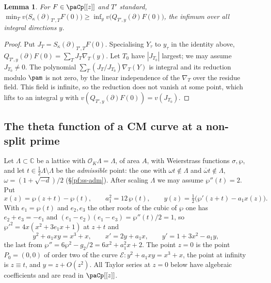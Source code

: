 \documentclass[10pt]{amsart}
\newtheorem{lemma}[theorem]{Lemma}
\theoremstyle{definition}
\theoremstyle{remark}
\newcommand{\C}{\mathbb C}
\providecommand{\auO}{\mathcal O}
\providecommand{\aubar}[1]{\overline{#1}}
\begin{document}
\begin{lemma}\label{pa:schur}
For $F\in\paCp[[z]]$ and $T'$ standard,
$\min_Tv\bigl(S_\kappa(\partial)_{T',T}F(0)\bigr)\ge\inf_yv\bigl(Q_{T',y}(\partial)F(0)\bigr)$,
the infimum over all integral directions $y$.
\end{lemma}
\begin{proof}
Put $J_T=S_\kappa(\partial)_{T',T}F(0)$. Specialising $Y_\tau$ to $y_\tau$ in the identity above,
$Q_{T',y}(\partial)F(0)=\sum_TJ_T\nabla_T(y)$. Let $T_0$ have $|J_{T_0}|$ largest; we may assume
$J_{T_0}\ne0$. The polynomial $\sum_T(J_T/J_{T_0})\nabla_T(Y)$ is integral and its reduction modulo
$\pam$ is not zero, by the linear independence of the $\nabla_T$ over the residue field. This
field is infinite, so the reduction does not vanish at some point, which lifts to an integral $y$
with $v(Q_{T',y}(\partial)F(0))=v(J_{T_0})$.
\end{proof}

\subsection{The theta function of a CM curve at a non-split prime}\label{pa:ss-curve}
Let $\Lambda\subset\C$ be a lattice with $\auO_K\Lambda=\Lambda$, of area $A$, with Weierstrass
functions $\sigma,\wp$, and let $t\in\tfrac12\Lambda\setminus\Lambda$ be the \emph{admissible} point: the one with
$\omega t\notin\Lambda$ and $\aubar\omega t\notin\Lambda$, $\omega=(1+\sqrt{-d})/2$ (\S\ref{pf:ss-adm}). After scaling
$\Lambda$ we may assume $\wp''(t)=2$. Put
\[
x(z)=\wp(z+t)-\wp(t),\qquad a_1^2=12\,\wp(t),\qquad y(z)=\tfrac12\bigl(\wp'(z+t)-a_1x(z)\bigr).
\]
With $e_1=\wp(t)$ and $e_2,e_3$ the other roots of the cubic of $\wp$ one has $e_2+e_3=-e_1$ and
$(e_1-e_2)(e_1-e_3)=\wp''(t)/2=1$, so $\wp'^2=4x(x^2+3e_1x+1)$ at $z+t$ and
\begin{equation}\label{pa:eq-curve}
y^2+a_1xy=x^3+x,\qquad x'=2y+a_1x,\qquad y'=1+3x^2-a_1y,
\end{equation}
the last from $\wp''=6\wp^2-g_2/2=6x^2+a_1^2x+2$. The point $z=0$ is the point $P_0=(0,0)$ of
order two of the curve $\mathcal E\colon y^2+a_1xy=x^3+x$, the point at infinity is $z\equiv t$,
and $y=z+O(z^2)$. All Taylor series at $z=0$ below have algebraic coefficients and are read in
$\paCp[[z]]$.
\end{document}
